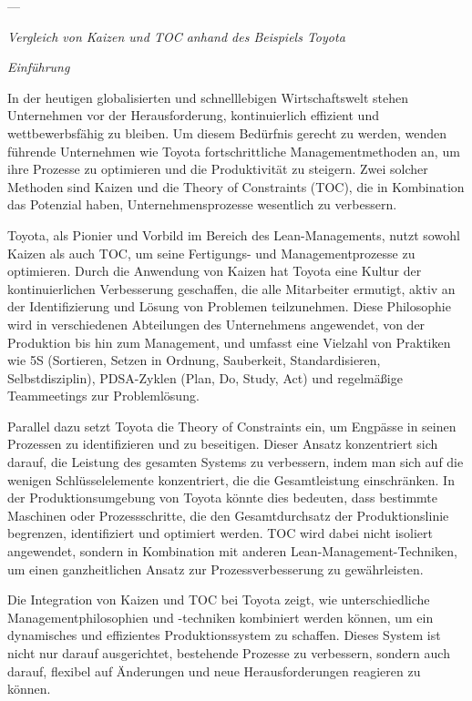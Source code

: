 ---

\textit{Vergleich von Kaizen und TOC anhand des Beispiels Toyota}

\textit{Einführung}

In der heutigen globalisierten und schnelllebigen Wirtschaftswelt stehen Unternehmen vor der Herausforderung, kontinuierlich effizient und wettbewerbsfähig zu bleiben. Um diesem Bedürfnis gerecht zu werden, wenden führende Unternehmen wie Toyota fortschrittliche Managementmethoden an, um ihre Prozesse zu optimieren und die Produktivität zu steigern. Zwei solcher Methoden sind Kaizen und die Theory of Constraints (TOC), die in Kombination das Potenzial haben, Unternehmensprozesse wesentlich zu verbessern. 

Toyota, als Pionier und Vorbild im Bereich des Lean-Managements, nutzt sowohl Kaizen als auch TOC, um seine Fertigungs- und Managementprozesse zu optimieren. Durch die Anwendung von Kaizen hat Toyota eine Kultur der kontinuierlichen Verbesserung geschaffen, die alle Mitarbeiter ermutigt, aktiv an der Identifizierung und Lösung von Problemen teilzunehmen. Diese Philosophie wird in verschiedenen Abteilungen des Unternehmens angewendet, von der Produktion bis hin zum Management, und umfasst eine Vielzahl von Praktiken wie 5S (Sortieren, Setzen in Ordnung, Sauberkeit, Standardisieren, Selbstdisziplin), PDSA-Zyklen (Plan, Do, Study, Act) und regelmäßige Teammeetings zur Problemlösung.

Parallel dazu setzt Toyota die Theory of Constraints ein, um Engpässe in seinen Prozessen zu identifizieren und zu beseitigen. Dieser Ansatz konzentriert sich darauf, die Leistung des gesamten Systems zu verbessern, indem man sich auf die wenigen Schlüsselelemente konzentriert, die die Gesamtleistung einschränken. In der Produktionsumgebung von Toyota könnte dies bedeuten, dass bestimmte Maschinen oder Prozessschritte, die den Gesamtdurchsatz der Produktionslinie begrenzen, identifiziert und optimiert werden. TOC wird dabei nicht isoliert angewendet, sondern in Kombination mit anderen Lean-Management-Techniken, um einen ganzheitlichen Ansatz zur Prozessverbesserung zu gewährleisten.

Die Integration von Kaizen und TOC bei Toyota zeigt, wie unterschiedliche Managementphilosophien und -techniken kombiniert werden können, um ein dynamisches und effizientes Produktionssystem zu schaffen. Dieses System ist nicht nur darauf ausgerichtet, bestehende Prozesse zu verbessern, sondern auch darauf, flexibel auf Änderungen und neue Herausforderungen reagieren zu können. 

